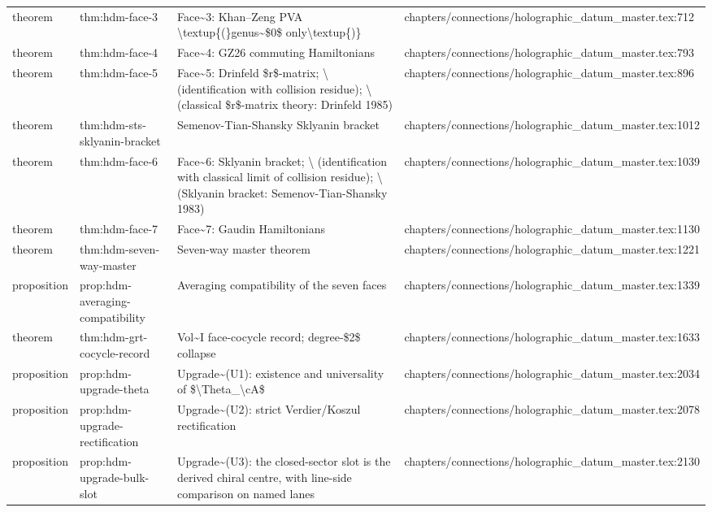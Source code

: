 \documentclass[11pt]{article}
\begin{document}
\begin{longtable}{L{0.10\textwidth}L{0.26\textwidth}L{0.42\textwidth}L{0.22\textwidth}}
theorem & thm:hdm-face-3 & Face\textasciitilde{}3: Khan--Zeng PVA \textbackslash{}textup\{(\}genus\textasciitilde{}\$0\$ only\textbackslash{}textup\{)\} & chapters/connections/holographic\_datum\_master.tex:712\\
theorem & thm:hdm-face-4 & Face\textasciitilde{}4: GZ26 commuting Hamiltonians & chapters/connections/holographic\_datum\_master.tex:793\\
theorem & thm:hdm-face-5 & Face\textasciitilde{}5: Drinfeld \$r\$-matrix; \textbackslash{} (identification with collision residue); \textbackslash{} (classical \$r\$-matrix theory: Drinfeld 1985) & chapters/connections/holographic\_datum\_master.tex:896\\
theorem & thm:hdm-sts-sklyanin-bracket & Semenov-Tian-Shansky Sklyanin bracket & chapters/connections/holographic\_datum\_master.tex:1012\\
theorem & thm:hdm-face-6 & Face\textasciitilde{}6: Sklyanin bracket; \textbackslash{} (identification with classical limit of collision residue); \textbackslash{} (Sklyanin bracket: Semenov-Tian-Shansky 1983) & chapters/connections/holographic\_datum\_master.tex:1039\\
theorem & thm:hdm-face-7 & Face\textasciitilde{}7: Gaudin Hamiltonians & chapters/connections/holographic\_datum\_master.tex:1130\\
theorem & thm:hdm-seven-way-master & Seven-way master theorem & chapters/connections/holographic\_datum\_master.tex:1221\\
proposition & prop:hdm-averaging-compatibility & Averaging compatibility of the seven faces & chapters/connections/holographic\_datum\_master.tex:1339\\
theorem & thm:hdm-grt-cocycle-record & Vol\textasciitilde{}I face-cocycle record; degree-\$2\$ collapse & chapters/connections/holographic\_datum\_master.tex:1633\\
proposition & prop:hdm-upgrade-theta & Upgrade\textasciitilde{}(U1): existence and universality of \$\textbackslash{}Theta\_\textbackslash{}cA\$ & chapters/connections/holographic\_datum\_master.tex:2034\\
proposition & prop:hdm-upgrade-rectification & Upgrade\textasciitilde{}(U2): strict Verdier/Koszul rectification & chapters/connections/holographic\_datum\_master.tex:2078\\
proposition & prop:hdm-upgrade-bulk-slot & Upgrade\textasciitilde{}(U3): the closed-sector slot is the derived chiral centre, with line-side comparison on named lanes & chapters/connections/holographic\_datum\_master.tex:2130\\

\end{longtable}
\end{document}
